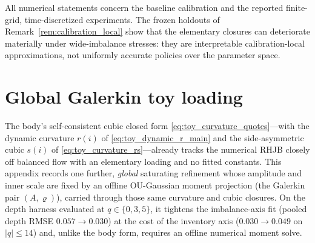 \documentclass[11pt,a4paper]{article}
\theoremstyle{plain}
\theoremstyle{definition}
\begin{document}
All numerical statements concern the baseline calibration and the reported
finite-grid, time-discretized experiments.  The frozen holdouts of
Remark~\ref{rem:calibration_local} show that the elementary closures can
deteriorate materially under wide-imbalance stresses: they are interpretable
calibration-local approximations, not uniformly accurate policies over the
parameter space.

\appendix

\section{Global Galerkin toy loading}
\label{app:toy_refined}

The body's self-consistent cubic closed form \eqref{eq:toy_curvature_quotes}---with the
dynamic curvature \(r(i)\) of \eqref{eq:toy_dynamic_r_main} and the
side-asymmetric cubic \(s(i)\) of \eqref{eq:toy_curvature_rs}---already tracks
the numerical RHJB closely off balanced flow with an elementary loading and no
fitted constants.  This appendix records one further, \emph{global} saturating
refinement whose amplitude and inner scale are fixed by an offline OU-Gaussian
moment projection (the Galerkin pair \((A,\varrho)\)), carried through those
same curvature and cubic closures.  On the depth harness evaluated at
\(q\in\{0,3,5\}\), it tightens the imbalance-axis fit (pooled depth RMSE
\(0.057\to0.030\)) at the cost of the inventory axis (\(0.030\to0.049\) on
\(|q|\le14\)) and, unlike the body form, requires an offline numerical moment
solve.
\end{document}
